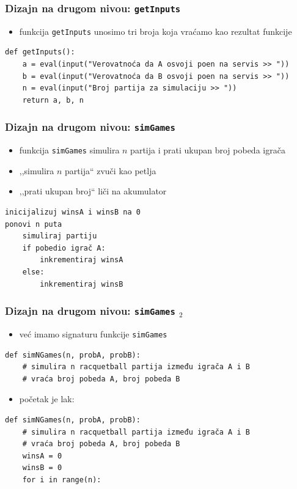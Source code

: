 \documentclass[utf8,compress,aspectratio=169]{beamer}
\begin{document}
\begin{frame}[fragile,shrink=15]
  \frametitle{Dizajn na drugom nivou: \texttt{getInputs}}
  \begin{itemize}
    \item funkcija \texttt{getInputs} unosimo tri broja koja vraćamo kao rezultat funkcije
  \end{itemize}
\begin{verbatim}
def getInputs():
    a = eval(input("Verovatnoća da A osvoji poen na servis >> "))
    b = eval(input("Verovatnoća da B osvoji poen na servis >> "))
    n = eval(input("Broj partija za simulaciju >> "))
    return a, b, n
\end{verbatim}
\end{frame}

\begin{frame}[fragile]
  \frametitle{Dizajn na drugom nivou: \texttt{simGames}}
  \begin{itemize}
    \item funkcija \texttt{simGames} simulira $n$ partija i prati ukupan broj pobeda igrača
    \item ,,simulira $n$ partija`` zvuči kao petlja
    \item ,,prati ukupan broj`` liči na akumulator
  \end{itemize}
\begin{verbatim}
inicijalizuj winsA i winsB na 0
ponovi n puta
    simuliraj partiju
    if pobedio igrač A:
        inkrementiraj winsA
    else:
        inkrementiraj winsB
\end{verbatim}
\end{frame}

\begin{frame}[fragile]
  \frametitle{Dizajn na drugom nivou: \texttt{simGames} $_2$}
  \begin{itemize}
    \item već imamo signaturu funkcije \texttt{simGames}
  \end{itemize}
\begin{verbatim}
def simNGames(n, probA, probB):
    # simulira n racquetball partija između igrača A i B
    # vraća broj pobeda A, broj pobeda B
\end{verbatim}
  \begin{itemize}
    \item početak je lak:
  \end{itemize}
\begin{verbatim}
def simNGames(n, probA, probB):
    # simulira n racquetball partija između igrača A i B
    # vraća broj pobeda A, broj pobeda B
    winsA = 0
    winsB = 0
    for i in range(n):
\end{verbatim}
\end{frame}
\end{document}
